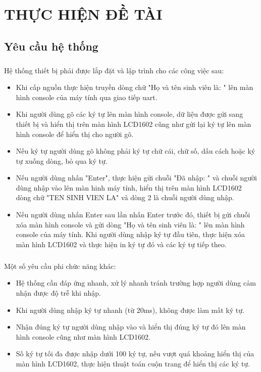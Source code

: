 \chapter{THỰC HIỆN ĐỀ TÀI}
\section{Yêu cầu hệ thống}
\paragraph{}
Hệ thống thiết bị phải được lắp đặt và lập trình cho các công việc sau:
\begin{itemize}
    \item Khi cấp nguồn thực hiện truyền dòng chữ "Họ và tên sinh viên là: " lên màn hình console của máy tính qua giao tiếp uart.
    \item Khi người dùng gõ các ký tự lên màn hình console, dữ liệu được gửi sang thiết bị và hiển thị trên màn hình LCD1602 cũng như gửi lại ký tự lên màn hình console để hiển thị cho người gõ.
    \item Nếu ký tự người dùng gõ không phải ký tự chữ cái, chữ số, dấu cách hoặc ký tự xuống dòng, bỏ qua ký tự.
    \item Nếu người dùng nhấn "Enter", thực hiện gửi chuỗi "Đã nhập: " và chuỗi người dùng nhập vào lên màn hinh máy tính, hiển thị trên màn hình LCD1602 dòng chữ "TEN SINH VIEN LA" và dòng 2 là chuỗi người dùng nhập.
    \item Nếu người dùng nhấn Enter sau lần nhấn Enter trước đó, thiết bị gửi chuỗi xóa màn hình console và gửi dòng "Họ và tên sinh viên là: " lên màn hình console của máy tính. Khi người dùng nhập ký tự đầu tiên, thực hiện xóa màn hình LCD1602 và thực hiện in ký tự đó và các ký tự tiếp theo.
\end{itemize}

\paragraph{}
Một số yêu cầu phi chức năng khác:
\begin{itemize}
    \item Hệ thống cần đáp ứng nhanh, xử lý nhanh tránh trường hợp người dùng cảm nhận được độ trễ khi nhập.
    \item Khi người dùng nhập ký tự nhanh (từ 20ms), không được làm mất ký tự.
    \item Nhận đúng ký tự người dùng nhập vào và hiển thị đúng ký tự đó lên màn hình console cũng như màn hình LCD1602.
    \item Số ký tự tối đa được nhập dưới 100 ký tự, nếu vượt quá khoảng hiển thị của màn hình LCD1602, thực hiện thuật toán cuộn trang để hiển thị các ký tự.
\end{itemize}
